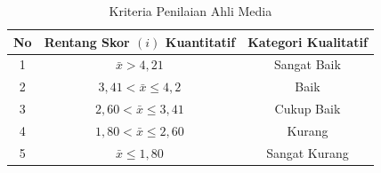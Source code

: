 \documentclass[12pt]{article}
\begin{document}
\begin{enumerate}
    \begin{table}[H]
        \centering
        \caption{Kriteria Penilaian Ahli Media}
        \begin{tabular}{|c|c|c|}
            \hline
            \textbf{No} & \textbf{Rentang Skor \( (i) \) Kuantitatif} & \textbf{Kategori Kualitatif}\\
            \hline
            1 & \( \bar{x} > 4{,}21 \) & Sangat Baik\\
            2 & \( 3{,}41 < \bar{x} \leq 4{,}2 \) & Baik\\
            3 & \( 2{,}60 < \bar{x} \leq 3{,}41 \) & Cukup Baik\\
            4 & \( 1{,}80 < \bar{x} \leq 2{,}60 \) & Kurang\\
            5 & \( \bar{x} \leq 1{,80} \) & Sangat Kurang\\
            \hline 
        \end{tabular}
    \end{table}


\end{enumerate}
\end{document}
